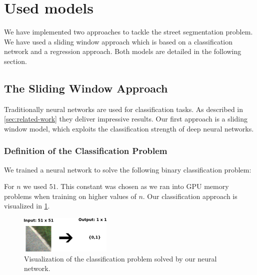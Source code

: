 
\section{Used models}\label{sec:model}

We have implemented two approaches to tackle  the street segmentation problem.
We have used a sliding window approach which is based on a classification
network and a regression approach. Both models are detailed in the following
section.

\subsection{The Sliding Window Approach}
Traditionally neural networks are used for classification tasks. As
described in \cref{sec:related-work} they deliver impressive results. Our first
approach is a sliding window model, which exploits the classification strength
of deep neural networks.

\subsubsection{Definition of the Classification Problem}
We trained a neural network to solve the following binary classification
problem:


For $n$ we used $51$. This constant was chosen as we ran into GPU memory
problems when training on higher values of $n$. Our classification approach is
visualized in \cref{fig:figure}.

\begin{figure}[H]
	\centering
	\includegraphics[width=0.5\columnwidth]{figures/models/sliding_window.png}
	\caption{Visualization of the classification problem solved by our neural network.}
	\label{fig:figure}
\end{figure}


